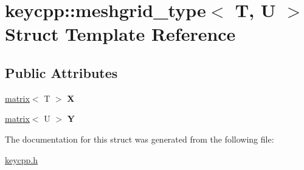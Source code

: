 \hypertarget{structkeycpp_1_1meshgrid__type}{\section{keycpp\-:\-:meshgrid\-\_\-type$<$ T, U $>$ Struct Template Reference}
\label{structkeycpp_1_1meshgrid__type}
}
\subsection*{Public Attributes}
\begin{DoxyCompactItemize}
\item 
\hypertarget{structkeycpp_1_1meshgrid__type_a0712fd393d718036db27d038aecd7074}{\hyperlink{classkeycpp_1_1matrix}{matrix}$<$ T $>$ {\bfseries X}}\label{structkeycpp_1_1meshgrid__type_a0712fd393d718036db27d038aecd7074}

\item 
\hypertarget{structkeycpp_1_1meshgrid__type_acb573b7a117ac6c6f0338ba5ab23c25d}{\hyperlink{classkeycpp_1_1matrix}{matrix}$<$ U $>$ {\bfseries Y}}\label{structkeycpp_1_1meshgrid__type_acb573b7a117ac6c6f0338ba5ab23c25d}

\end{DoxyCompactItemize}


The documentation for this struct was generated from the following file\-:\begin{DoxyCompactItemize}
\item 
\hyperlink{keycpp_8h}{keycpp.\-h}\end{DoxyCompactItemize}
